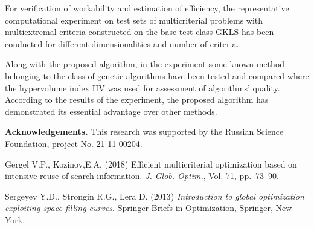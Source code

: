 \documentclass[oribibl]{llncs}
\begin{document}
For verification of workability and estimation of efficiency, the representative computational experiment on test sets of multicriterial problems with multiextremal criteria constructed on the base test class GKLS  has been conducted for different dimensionalities and number of criteria. 

Along with the proposed algorithm, in the experiment some known method belonging to the class of genetic algorithms have been tested and compared where the hypervolume index  HV was used for assessment of algorithms' quality. According to the results of the experiment, the proposed algorithm  has demonstrated its essential advantage over other methods.


\textbf{Acknowledgements.} 
This research was supported by the Russian Science Foundation, project No. 21-11-00204.

 \vspace{0.5cm}

\begin{thebibliography}{4}

Gergel V.P., Kozinov,E.A. (2018) Efficient multicriterial optimization based on intensive reuse of search information. \emph{J. Glob. Optim.},  Vol. 71, pp.~73--90.

Sergeyev Y.D., Strongin R.G., Lera D. (2013) \emph{Introduction to global optimization exploiting space-filling curves}. Springer Briefs in Optimization, Springer, New York.


\end{thebibliography}
\end{document}
